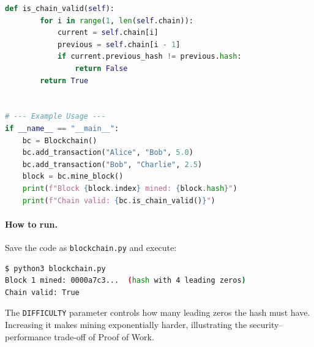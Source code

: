 \begin{lstlisting}[language=Python, caption={A minimal blockchain implementation in Python.}, label={lst:blockchain}]
    def is_chain_valid(self):
        for i in range(1, len(self.chain)):
            current = self.chain[i]
            previous = self.chain[i - 1]
            if current.previous_hash != previous.hash:
                return False
        return True


# --- Example Usage ---
if __name__ == "__main__":
    bc = Blockchain()
    bc.add_transaction("Alice", "Bob", 5.0)
    bc.add_transaction("Bob", "Charlie", 2.5)
    block = bc.mine_block()
    print(f"Block {block.index} mined: {block.hash}")
    print(f"Chain valid: {bc.is_chain_valid()}")
\end{lstlisting}

\paragraph{How to run.} Save the code as \texttt{blockchain.py} and execute:
\begin{lstlisting}[language=bash, numbers=none, frame=none]
$ python3 blockchain.py
Block 1 mined: 0000a7c3...  (hash with 4 leading zeros)
Chain valid: True
\end{lstlisting}

The \texttt{DIFFICULTY} parameter controls how many leading zeros the hash must have. Increasing it makes mining exponentially harder, illustrating the security--performance trade-off of Proof of Work.
